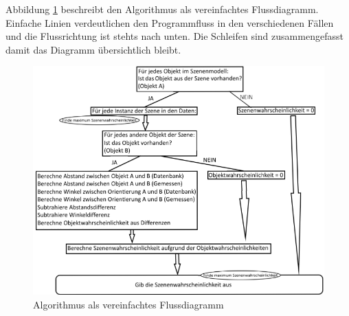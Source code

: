 Abbildung \ref{img:janein} beschreibt den Algorithmus als vereinfachtes Flussdiagramm. Einfache Linien verdeutlichen den Programmfluss in den verschiedenen Fällen und die Flussrichtung ist stehts nach unten. Die Schleifen sind zusammengefasst damit das Diagramm übersichtlich bleibt.
\begin{figure}
	\centering
	\includegraphics[width=16cm]{bilder/AlgorithmusRoh.pdf}
	\caption{Algorithmus als vereinfachtes Flussdiagramm}
	\label{img:janein}
\end{figure}
